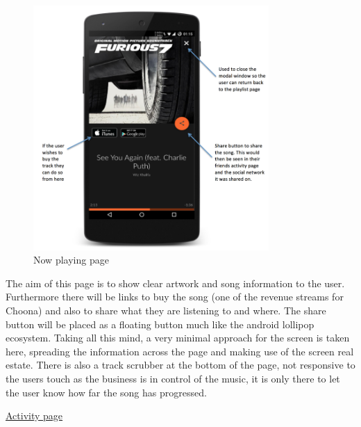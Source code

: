 \noindent
\begin{figure}[h!]
\centering
\includegraphics[width=0.8\textwidth]{./img/nowplayingannotated.png}
\caption{Now playing page}
\label{fig:nowplaying}
\end{figure}

The aim of this page is to show clear artwork and song information to the user. Furthermore there will be links to buy the song (one of the revenue streams for Choona) and also to share what they are listening to and where. The share button will be placed as a floating button much like the android lollipop ecosystem. Taking all this mind, a very minimal approach for the screen is taken here, spreading the information across the page and making use of the screen real estate. There is also a track scrubber at the bottom of the page, not responsive to the users touch as the business is in control of the music, it is only there to let the user know how far the song has progressed.   

\clearpage

\noindent\underline{Activity page}\newline

